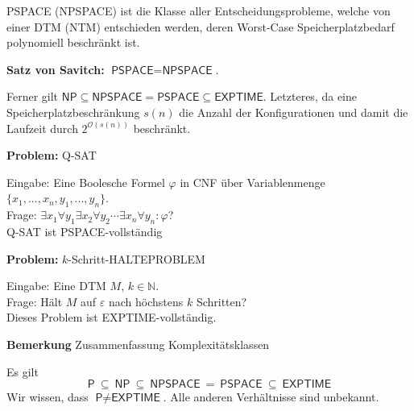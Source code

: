 \documentclass[a4paper,graphics,11pt]{article}
\newcommand{\eps}[0]{\varepsilon}
\begin{document}
\textsf{PSPACE} (\textsf{NPSPACE}) ist die Klasse aller Entscheidungsprobleme, welche von einer
DTM (NTM) entschieden werden, deren Worst-Case Speicherplatzbedarf polynomiell beschränkt ist.

\textbf{Satz von Savitch:} $\textsf{PSPACE} = \textsf{NPSPACE}$.

Ferner gilt $\textsf{NP} \subseteq \textsf{NPSPACE} = \textsf{PSPACE} \subseteq \textsf{EXPTIME}$.
Letzteres, da eine Speicherplatzbeschränkung $s(n)$ die Anzahl der Konfigurationen und damit die Laufzeit
durch $2^{\mathcal{O}(s(n))}$ beschränkt.


\newpage

\textbf{Problem:} Q-SAT

Eingabe: Eine Boolesche Formel $\varphi$ in CNF über Variablenmenge $\{x_1,...,x_n,y_1,...,y_n\}$.
\\[10pt]
Frage: $\exists x_1 \forall y_1 \exists x_2 \forall y_2 \cdots \exists x_n \forall y_n : \varphi$?
\\[10pt]
Q-SAT ist \textsf{PSPACE}-vollständig

\strut

\textbf{Problem:} $k$-Schritt-HALTEPROBLEM

Eingabe: Eine DTM $M$, $k \in \mathbb{N}$.
\\[10pt]
Frage: Hält $M$ auf $\eps$ nach höchstens $k$ Schritten?
\\[10pt]
Dieses Problem ist \textsf{EXPTIME}-vollständig.

\strut

\textbf{Bemerkung} Zusammenfassung Komplexitätsklassen

Es gilt
$$
    \textsf{P}\ \subseteq\ \textsf{NP}\ \subseteq\ \textsf{NPSPACE}\ =\ \textsf{PSPACE}\ \subseteq\ \textsf{EXPTIME}
$$
Wir wissen, dass $\textsf{P} \neq \textsf{EXPTIME}$. Alle anderen Verhältnisse sind unbekannt.
\end{document}
